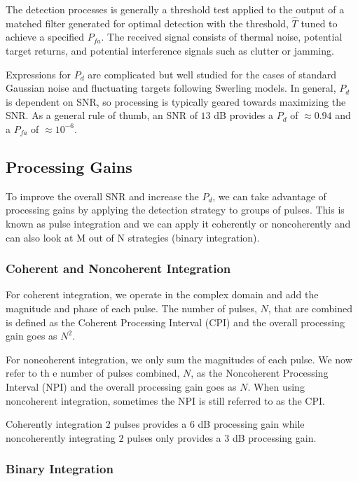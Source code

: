 The detection processes is generally a threshold test applied to the output of a matched filter generated for optimal detection with the threshold, $\hat{T}$ tuned to achieve a specified $P_{fa}$. The received signal consists of thermal noise, potential target returns, and potential interference signals such as clutter or jamming.

Expressions for $P_d$ are complicated but well studied for the cases of standard Gaussian noise and fluctuating targets following Swerling models. In general, $P_d$ is dependent on SNR, so processing is typically geared towards maximizing the SNR. As a general rule of thumb, an SNR of $13$ dB provides a $P_d$ of $\approx 0.94$ and a $P_{fa}$ of $\approx 10^{-6}$.

\subsection{Processing Gains}
To improve the overall SNR and increase the $P_d$, we can take advantage of processing gains by applying the detection strategy to groups of pulses. This is known as pulse integration and we can apply it coherently or noncoherently and can also look at M out of N strategies (binary integration).

\subsubsection{Coherent and Noncoherent Integration}
For coherent integration, we operate in the complex domain and add the magnitude and phase of each pulse. The number of pulses, $N$, that are combined is defined as the Coherent Processing Interval (CPI) and the overall processing gain goes as $N^2$.

For noncoherent integration, we only sum the magnitudes of each pulse. We now refer to th e number of pulses combined, $N$, as the Noncoherent Processing Interval (NPI) and the overall processing gain goes as $N$. When using noncoherent integration, sometimes the NPI is still referred to as the CPI.

Coherently integration $2$ pulses provides a $6$ dB processing gain while noncoherently integrating $2$ pulses only provides a $3$ dB processing gain.

\subsubsection{Binary Integration}